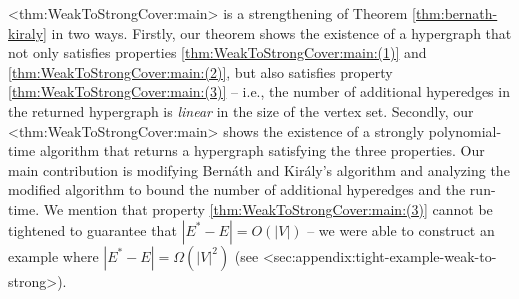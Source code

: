 \documentclass{article}
\def\Cref#1{<#1>}%
\newcommand{\functionMaximizationOracleStrongCover}[1]{\ensuremath{{#1}\text{-}\mathtt{max}\text{-}\mathtt{sc}\text{-}\mathtt{Oracle}}\xspace}
\begin{document}
\Cref{thm:WeakToStrongCover:main} is a strengthening of Theorem \ref{thm:bernath-kiraly} in two ways. Firstly, our theorem shows the existence of a hypergraph that not only satisfies properties \ref{thm:WeakToStrongCover:main:(1)} and \ref{thm:WeakToStrongCover:main:(2)}, but also satisfies property \ref{thm:WeakToStrongCover:main:(3)} -- i.e., the number of additional hyperedges in the returned hypergraph is \emph{linear} in the size of the vertex set. Secondly, our \Cref{thm:WeakToStrongCover:main} shows the existence of a strongly polynomial-time algorithm that returns a hypergraph satisfying the three properties. 
Our main contribution is modifying Bern\'{a}th and Kir\'{a}ly's algorithm and analyzing the modified algorithm to bound the number of additional hyperedges and the run-time. 
We mention that property \ref{thm:WeakToStrongCover:main:(3)} cannot be tightened to guarantee that $|E^*-E|=O(|V|)$ -- we were able to construct an example where 
$|E^*-E|=\Omega(|V|^2)$ (see \Cref{sec:appendix:tight-example-weak-to-strong}). 

\end{document}
